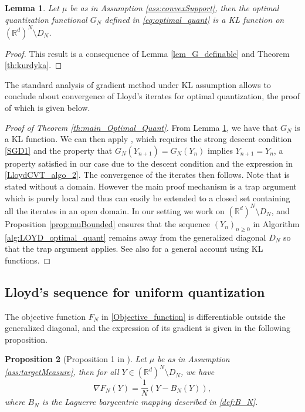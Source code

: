 \documentclass[11pt]{article}
\newcommand{\R}{\mathbb R}
\newcommand{\1}{\mathbbm{1}}
\newtheorem{lem}{Lemma}[section]
\newtheorem{prop}[lem]{Proposition}
\numberwithin{equation}{section}
\begin{document}
\begin{lem}\label{lem_mu_GSA_implies_G_KL}
	Let $\mu$ be as in Assumption \ref{ass:convexSupport}, then the optimal quantization functional $G_{N}$ defined in \eqref{eq:optimal_quant} is a KL function on $(\R^d)^N \setminus D_N$.
\end{lem}
\begin{proof}
	This result is a consequence of Lemma \ref{lem_G_definable} and Theorem \ref{th:kurdyka}.
\end{proof}

The standard analysis of gradient method under KL assumption allows to conclude about convergence of Lloyd's iterates for optimal quantization, the proof of which is given below.

\begin{proof}[Proof of Theorem \ref{th:main_Optimal_Quant}]
	From Lemma \ref{lem_mu_GSA_implies_G_KL}, we have that $G_{N}$ is a KL function. We can then apply \cite[Theorem 3.4]{AbsMahAnd2005}, which requires the strong descent condition \eqref{SGD1} and the property that $G_N(Y_{n+1}) = G_N(Y_n)$ implies $Y_{n+1} = Y_n$, a property satisfied in our case due to the descent condition and the expression in \eqref{LloydCVT_algo_2}. The convergence of the iterates then follows. Note that \cite[Theorem 3.4]{AbsMahAnd2005} is stated without a domain. However the main proof mechanism is a trap argument which is purely local and thus can easily be extended to a closed set containing all the iterates in an open domain. In our setting we work on $(\R^d)^N \setminus D_N$, and Proposition \ref{prop:muBounded} ensures that the sequence $(Y_n)_{n\geq 0}$ in Algorithm \ref{alg:LOYD_optimal_quant} remains away from the generalized diagonal $D_N$ so that the trap argument applies. See also \cite{attouch2013convergence} for a general account using KL functions. 
\end{proof}


\subsection{Lloyd's sequence for uniform quantization}
\label{sec:uniform_quant}
The objective function $F_N$ in \eqref{Objective_function} is differentiable outside the generalized diagonal, and the expression of its gradient is given in the following proposition.
\begin{prop}[Proposition 1 in \cite{nonassymptotic}]
\label{Gradient}
	Let $\mu$ be as in Assumption \ref{ass:targetMeasure}, then for all $Y\in(\R^d)^N\setminus D_{N}$, we have
    \begin{equation}
        \nabla F_{N}(Y)=\frac{1}{N}\left(Y-B_{N}(Y)\right),
        \label{eq:grad_FN}
    \end{equation}
	where $B_N$ is the Laguerre barycentric mapping described in \eqref{def:B_N}.
\end{prop}
\end{document}
